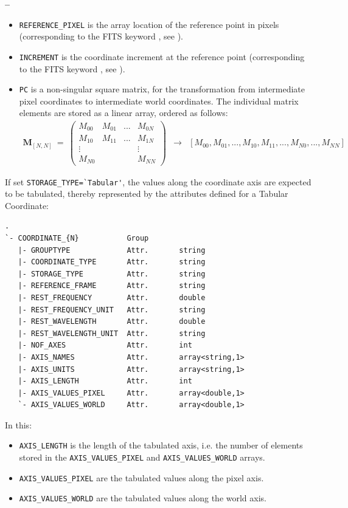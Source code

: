 \documentclass[a4paper,10pt,bibtotoc]{scrreprt}
\begin{document}
\begin{list}{\textbf{--}}{}
\begin{itemize}
   (corresponding to the FITS keyword , see \cite{fits.paper1}).
 \item \verb|REFERENCE_PIXEL| is the array location of the reference point in 
   pixels (corresponding to the FITS keyword , see \cite{fits.paper1}).
 \item \verb|INCREMENT| is the coordinate increment at the reference point
   (corresponding to the FITS keyword , see \cite{fits.paper1}).
 \item \verb|PC| is a non-singular square matrix, for the
   transformation from intermediate pixel coordinates to intermediate
   world coordinates. The individual matrix elements are stored as a
   linear array, ordered as follows:
   \begin{eqnarray*}
     \mathbf{M}_{[N,N]} \ = \ \left(
       \begin{array}{cccc}
         M_{00}  & M_{01} & ... & M_{0N} \\
         M_{10}  & M_{11} & ... & M_{1N} \\
         \vdots  &       &     & \vdots \\
         M_{N0}  &        &     & M_{NN}
       \end{array}
     \right) 
     & \rightarrow &
     \left[ M_{00}, M_{01}, ... , M_{10}, M_{11}, ..., M_{N0}, ..., M_{NN} \right]
   \end{eqnarray*}
 \end{itemize}
 If set \verb|STORAGE_TYPE=`Tabular'|, the values along
 the coordinate axis are expected to be tabulated, thereby represented by the
 attributes defined for a Tabular Coordinate:
 \begin{lstlisting}
.
`- COORDINATE_{N}           Group
   |- GROUPTYPE             Attr.       string
   |- COORDINATE_TYPE       Attr.       string
   |- STORAGE_TYPE          Attr.       string
   |- REFERENCE_FRAME       Attr.       string
   |- REST_FREQUENCY        Attr.       double
   |- REST_FREQUENCY_UNIT   Attr.       string
   |- REST_WAVELENGTH       Attr.       double
   |- REST_WAVELENGTH_UNIT  Attr.       string
   |- NOF_AXES              Attr.       int
   |- AXIS_NAMES            Attr.       array<string,1>
   |- AXIS_UNITS            Attr.       array<string,1>
   |- AXIS_LENGTH           Attr.       int
   |- AXIS_VALUES_PIXEL     Attr.       array<double,1>
   `- AXIS_VALUES_WORLD     Attr.       array<double,1>
 \end{lstlisting}
 In this:
 \begin{itemize}
 \item \verb|AXIS_LENGTH| is the length of the tabulated axis,
   i.e. the number of elements stored in the \verb|AXIS_VALUES_PIXEL|
   and \verb|AXIS_VALUES_WORLD| arrays.
 \item \verb|AXIS_VALUES_PIXEL| are the tabulated values along the pixel
    axis.
 \item \verb|AXIS_VALUES_WORLD| are the tabulated values along the world
    axis.
 \end{itemize}
\end{list}
\end{document}
